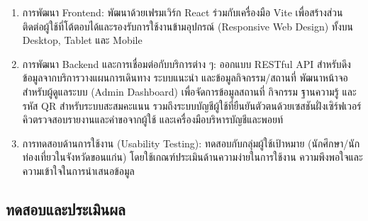 \begin{enumerate}[label=(\arabic*),leftmargin=0pt,itemindent=\dimexpr\parindent+\parenlabelwidth+1em\relax,align=right,labelwidth=\parenlabelwidth,labelsep=1em]
ระบบประมวลผลคำถามของผู้ใช้ผ่าน 3 ขั้นตอนหลัก ได้แก่ การเขียนคำถามใหม่จากประวัติการสนทนาและค้นคืนข้อมูลที่เกี่ยวข้องจากสถานที่ ฐานความรู้ และกิจกรรมด้วยเทคนิค RAG แบบผสม (Information Retrieval) การให้ LLM สังเคราะห์คำตอบแบบทยอยแสดงผลพร้อมกลไกป้องกันการตอบข้อมูลที่ไม่มีหลักฐานรองรับ (Response Generation with Hallucination Guard) และการแสดงการ์ดสถานที่หรือกิจกรรมแนะนำจากผลการค้นคืน เฉพาะแหล่งข้อมูลที่คำตอบอ้างถึง (Recommendation)

\item การพัฒนา Frontend: พัฒนาด้วยเฟรมเวิร์ก React ร่วมกับเครื่องมือ Vite เพื่อสร้างส่วนติดต่อผู้ใช้ที่โต้ตอบได้และรองรับการใช้งานข้ามอุปกรณ์ (Responsive Web Design) ทั้งบน Desktop, Tablet และ Mobile
\item การพัฒนา Backend และการเชื่อมต่อกับบริการต่าง ๆ: ออกแบบ RESTful API สำหรับดึงข้อมูลจากบริการวางแผนการเดินทาง ระบบแนะนำ และข้อมูลกิจกรรม/สถานที่ พัฒนาหน้าจอสำหรับผู้ดูแลระบบ (Admin Dashboard) เพื่อจัดการข้อมูลสถานที่ กิจกรรม ฐานความรู้ และรหัส QR สำหรับระบบสะสมคะแนน รวมถึงระบบบัญชีผู้ใช้ที่ยืนยันตัวตนด้วยเซสชันฝั่งเซิร์ฟเวอร์ คิวตรวจสอบรายงานและคำขอจากผู้ใช้ และเครื่องมือบริหารบัญชีและพอยท์
\item การทดสอบด้านการใช้งาน (Usability Testing): ทดสอบกับกลุ่มผู้ใช้เป้าหมาย (นักศึกษา/นักท่องเที่ยวในจังหวัดขอนแก่น) โดยใช้เกณฑ์ประเมินด้านความง่ายในการใช้งาน ความพึงพอใจและความเข้าใจในการนำเสนอข้อมูล
\end{enumerate}

\subsection{ทดสอบและประเมินผล}

